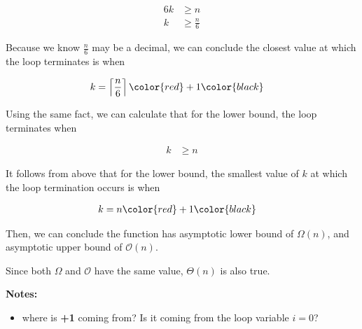\documentclass[12pt]{article}
\begin{document}
\begin{enumerate}[a.]
\begin{mdframed}
        \begin{align}
            6k &\geq n\\
            k &\geq \frac{n}{6}
        \end{align}

        Because we know $\frac{n}{6}$ may be a decimal, we can conclude the closest value at
        which the loop terminates is when

        \begin{align}
            k &= \left\lceil \frac{n}{6} \right\rceil \color{red}+1\color{black}
        \end{align}

        \bigskip

        Using the same fact, we can calculate that for the lower bound, the loop
        terminates when

        \begin{align}
            k &\geq n
        \end{align}

        It follows from above that for the lower bound, the smallest value of $k$ at which
        the loop termination occurs is when

        \begin{align}
            k &= n \color{red}+1\color{black}
        \end{align}

        \bigskip

        Then, we can conclude the function has asymptotic lower bound of $\Omega(n)$, and
        asymptotic upper bound of $\mathcal{O}(n)$.

        \bigskip

        Since both $\Omega$ and $\mathcal{O}$ have the same value, $\Theta(n)$
        is also true.

    \end{mdframed}

    \bigskip

    \textbf{Notes:}

    \begin{itemize}
        \item where is \textbf{+1} coming from? Is it coming from the loop variable $i = 0$?




\end{itemize}
\end{enumerate}
\end{document}
